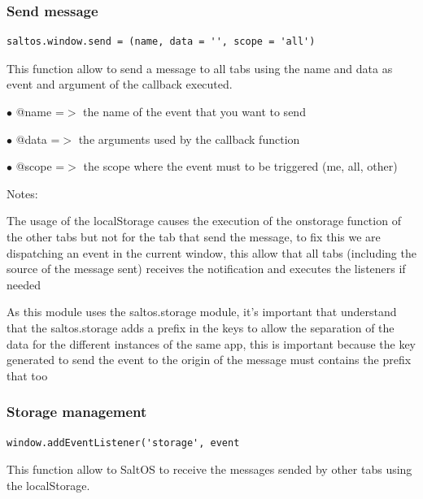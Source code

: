 \documentclass[a4paper]{article}
\begin{document}
\hypertarget{toc310}{}
\subsubsection{Send message}

\begin{lstlisting}
saltos.window.send = (name, data = '', scope = 'all')
\end{lstlisting}

This function allow to send a message to all tabs using the name and data
as event and argument of the callback executed.

\begin{compactitem}
\item[\color{myblue}$\bullet$] @name  =$>$ the name of the event that you want to send
\item[\color{myblue}$\bullet$] @data  =$>$ the arguments used by the callback function
\item[\color{myblue}$\bullet$] @scope =$>$ the scope where the event must to be triggered (me, all, other)
\end{compactitem}

Notes:

The usage of the localStorage causes the execution of the onstorage function
of the other tabs but not for the tab that send the message, to fix this we
are dispatching an event in the current window, this allow that all tabs
(including the source of the message sent) receives the notification and
executes the listeners if needed

As this module uses the saltos.storage module, it's important that understand
that the saltos.storage adds a prefix in the keys to allow the separation of
the data for the different instances of the same app, this is important because
the key generated to send the event to the origin of the message must contains
the prefix that too

\hypertarget{toc311}{}
\subsubsection{Storage management}

\begin{lstlisting}
window.addEventListener('storage', event
\end{lstlisting}

This function allow to SaltOS to receive the messages sended by other tabs
using the localStorage.

\end{document}

